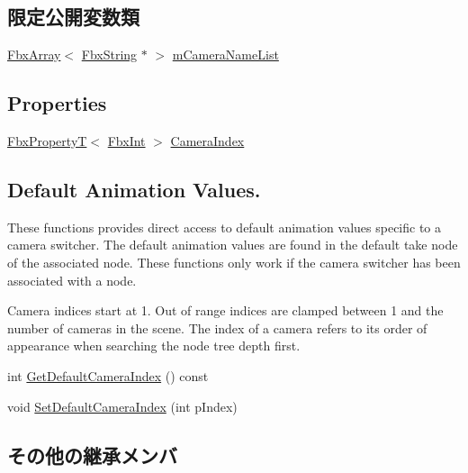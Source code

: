 \subsection*{限定公開変数類}
\begin{DoxyCompactItemize}
\item 
\hyperlink{class_fbx_array}{Fbx\+Array}$<$ \hyperlink{class_fbx_string}{Fbx\+String} $\ast$ $>$ \hyperlink{class_fbx_camera_switcher_a03c2a77943c839af5cec42d8566724a9}{m\+Camera\+Name\+List}
\end{DoxyCompactItemize}
\subsection*{Properties}
\begin{DoxyCompactItemize}
\item 
\hyperlink{class_fbx_property_t}{Fbx\+PropertyT}$<$ \hyperlink{fbxtypes_8h_a088fa96de3b0b3ea69f0f6afef525dfb}{Fbx\+Int} $>$ \hyperlink{class_fbx_camera_switcher_a9128f6b644b222070f2e34e69874a41d}{Camera\+Index}
\end{DoxyCompactItemize}
\subsection*{Default Animation Values.}
\label{_amgrpf376b4419eaa217aa41352419bb6aa6e}%
These functions provides direct access to default animation values specific to a camera switcher. The default animation values are found in the default take node of the associated node. These functions only work if the camera switcher has been associated with a node.

Camera indices start at 1. Out of range indices are clamped between 1 and the number of cameras in the scene. The index of a camera refers to its order of appearance when searching the node tree depth first. \begin{DoxyCompactItemize}
\item 
int \hyperlink{class_fbx_camera_switcher_a283e9644112eee776c029b59ea02f857}{Get\+Default\+Camera\+Index} () const
\item 
void \hyperlink{class_fbx_camera_switcher_a23c4972acf381134aee70436e7d18549}{Set\+Default\+Camera\+Index} (int p\+Index)
\end{DoxyCompactItemize}
\subsection*{その他の継承メンバ}


